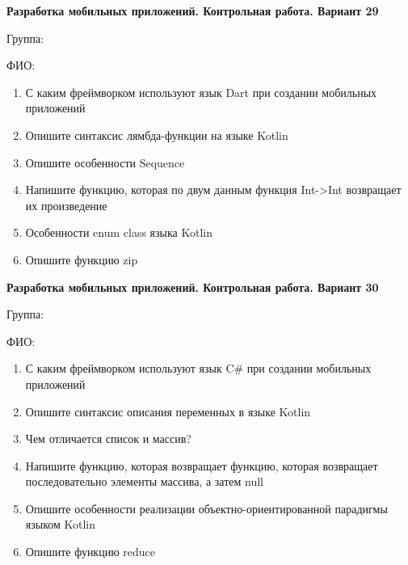 \documentclass[12pt]{article}
\begin{document}
\newpage\begin{minipage}{\textwidth}
\textbf{Разработка мобильных приложений. Контрольная работа. Вариант 29}

Группа: \underline{\hspace{3cm}}

ФИО: \underline{\hspace{10cm}}

\begin{enumerate}
\item С каким фреймворком используют язык Dart при создании мобильных приложений
\item Опишите синтаксис лямбда-функции на языке Kotlin
\item Опишите особенности Sequence
\item Напишите функцию, которая по двум данным функция Int->Int возвращает их произведение
\item Особенности enum class языка Kotlin
\item Опишите функцию zip

\end{enumerate}
\end{minipage}

\newpage\begin{minipage}{\textwidth}
\textbf{Разработка мобильных приложений. Контрольная работа. Вариант 30}

Группа: \underline{\hspace{3cm}}

ФИО: \underline{\hspace{10cm}}

\begin{enumerate}
\item С каким фреймворком используют язык C\# при создании мобильных приложений
\item Опишите синтаксис описания переменных в языке Kotlin
\item Чем отличается список и массив?
\item Напишите функцию, которая возвращает функцию, которая возвращает последовательно элементы массива, а затем null
\item Опишите особенности реализации объектно-ориентированной парадигмы языком Kotlin
\item Опишите функцию reduce

\end{enumerate}
\end{minipage}
\end{document}
